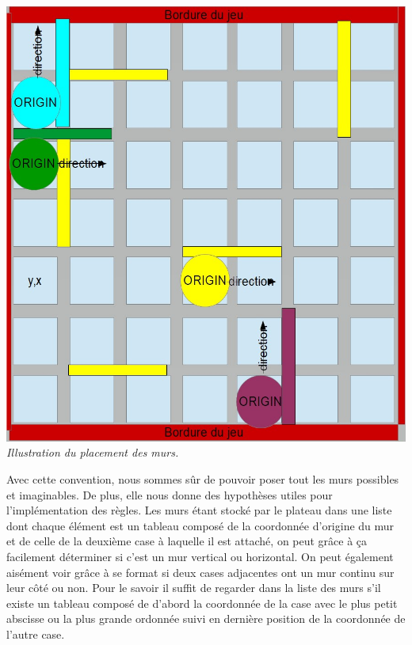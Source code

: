 \documentclass[a4paper, 12pt]{article}
\begin{document}
\begin{center}
\includegraphics[scale=0.3]{wall.jpg} \\
\textit{Illustration du placement des murs.}
\end{center}
Avec cette convention, nous sommes sûr de pouvoir poser tout les murs possibles et imaginables. De plus, elle nous donne des hypothèses utiles pour l'implémentation des règles. Les murs étant stocké par le plateau dans une liste dont chaque élément est un tableau composé de la coordonnée d'origine du mur et de celle de la deuxième case à laquelle il est attaché, on peut grâce à ça facilement déterminer si c'est un mur vertical ou horizontal. On peut également aisément voir grâce à se format si deux cases adjacentes ont un mur continu sur leur côté ou non. Pour le savoir il suffit de regarder dans la liste des murs s'il existe un tableau composé de d'abord la coordonnée de la case avec le plus petit abscisse ou la plus grande ordonnée suivi en dernière position de la coordonnée de l'autre case.
\end{document}
